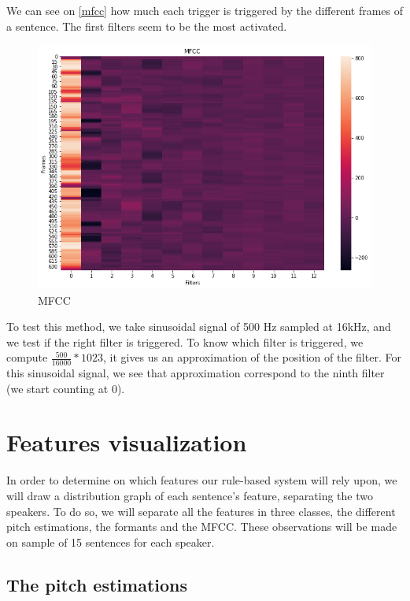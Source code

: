 \documentclass[]{article}
\begin{document}
We can see on \autoref{mfcc} how much each trigger is triggered by the different frames
of a sentence. The first filters seem to be the most activated.

\begin{figure}[H]
    \centering
    \caption{\label{mfcc}MFCC}
    \includegraphics[scale=0.5]{images/mfcc.png}
\end{figure}

To test this method, we take sinusoidal signal of 500 Hz sampled at 16kHz, and we test if the right filter is triggered. To know which filter is triggered,
we compute $\frac{500}{16000}*1023$, it gives us an approximation of the position of the filter. For this sinusoidal
signal, we see that approximation correspond to the ninth filter (we start counting at 0).


\section{Features visualization}

In order to determine on which features our rule-based system will rely upon, we will draw a
distribution graph of each sentence's feature, separating the two speakers. To do so, we will separate all
the features in three classes, the different pitch estimations, the formants and
the MFCC. These observations will be made on sample of
15 sentences for each speaker.

\subsection{The pitch estimations}
\end{document}
